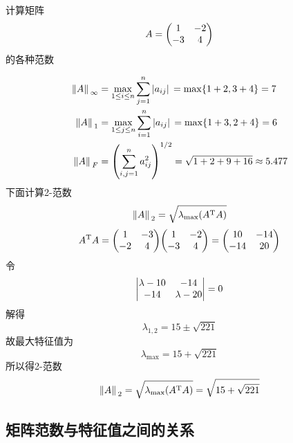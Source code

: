 \begin{example}
    计算矩阵
    \begin{equation*}
        A=\mqty(
            1&-2\\
            -3&4
        )
    \end{equation*}
    的各种范数
\end{example}
\begin{solution}
    \begin{align*}
        \norm*{A}_\infty&=\max_{1\le i\le n}\sum_{j=1}^n\abs*{a_{ij}}=\max\{1+2,3+4\}=7\\
        \norm*{A}_1&=\max_{1\le j\le n}\sum_{i=1}^n\abs*{a_{ij}}=\max\{1+3,2+4\}=6\\
        \norm*{A}_F&=\left(\sum_{i,j=1}^na_{ij}^2\right)^{1/2}=\sqrt{1+2+9+16}\approx5.477
    \end{align*}
    下面计算2-范数
    \begin{equation*}
        \norm*{A}_2=\sqrt{\lambda_\text{max}(A^\text{T}A)}
    \end{equation*}
    \begin{equation*}
        \transpose{A}A=\mqty(
            1&-3\\
            -2&4
        )\mqty(
            1&-2\\
            -3&4
        )=\mqty(
            10&-14\\
            -14&20
        )
    \end{equation*}
    令
    \begin{equation*}
        \mqty|
        \lambda-10&-14\\
        -14&\lambda-20|=0
    \end{equation*}
    解得
    \begin{equation*}
        \lambda_{1,2}=15\pm\sqrt{221}
    \end{equation*}
    故最大特征值为
    \begin{equation*}
        \lambda_\text{max}=15+\sqrt{221}
    \end{equation*}
    所以得2-范数
    \begin{equation*}
        \norm*{A}_2=\sqrt{\lambda_\text{max}(A^\text{T}A)}=\sqrt{15+\sqrt{221}}
    \end{equation*}
\end{solution}

\subsection{矩阵范数与特征值之间的关系}


